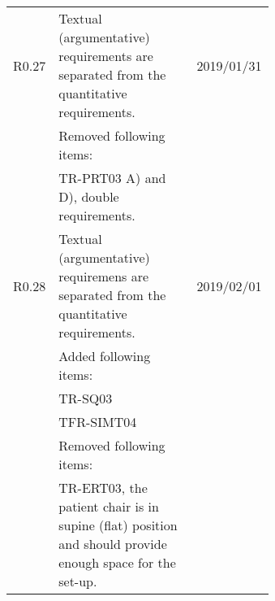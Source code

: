 \begin{longtable}{|c|p{0.64\linewidth}|l|}
		 	R0.27 & Textual (argumentative) requirements are separated from the quantitative requirements. & 2019/01/31 \\
		 	& Removed following items: & \\
		 	& \hspace{0.5cm} \textbullet TR-PRT03 A) and D), double requirements. \\
		 	R0.28 & Textual (argumentative) requiremens are separated from the quantitative requirements. & 2019/02/01 \\
		 	& Added following items: & \\
		 	& \hspace{0.5cm} \textbullet TR-SQ03 & \\
		 	& \hspace{0.5cm} \textbullet TFR-SIMT04 & \\
		 	& Removed following items: & \\
		 	& \hspace{0.5cm} \textbullet TR-ERT03, the patient chair is in supine (flat) position and should provide enough space for the set-up. & \\
		\hline
\end{longtable}

\newpage

